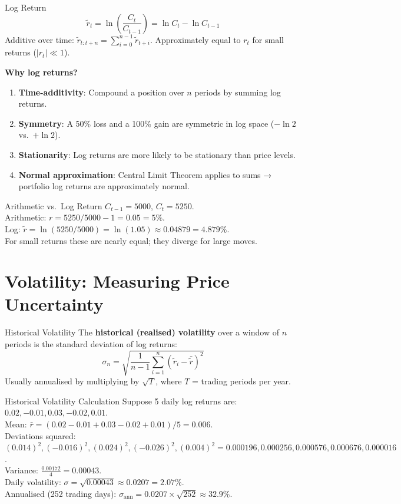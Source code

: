 \documentclass[12pt,a4paper,openany]{report}
\theoremstyle{definition}
\begin{document}
\begin{definitionbox}{Log Return}
\[
  \tilde{r}_t = \ln\!\left(\frac{C_t}{C_{t-1}}\right) = \ln C_t - \ln C_{t-1}
\]
Additive over time: $\tilde{r}_{t:t+n} = \sum_{i=0}^{n-1} \tilde{r}_{t+i}$. Approximately equal to $r_t$ for small returns ($|r_t| \ll 1$).
\end{definitionbox}

\textbf{Why log returns?}
\begin{enumerate}[label=\arabic*.]
  \item \textbf{Time-additivity}: Compound a position over $n$ periods by summing log returns.
  \item \textbf{Symmetry}: A 50\% loss and a 100\% gain are symmetric in log space ($-\ln 2$ vs.\ $+\ln 2$).
  \item \textbf{Stationarity}: Log returns are more likely to be stationary than price levels.
  \item \textbf{Normal approximation}: Central Limit Theorem applies to sums → portfolio log returns are approximately normal.
\end{enumerate}

\begin{examplebox}{Arithmetic vs.\ Log Return}
$C_{t-1} = 5000$, $C_t = 5250$. \\
Arithmetic: $r = 5250/5000 - 1 = 0.05 = 5\%$. \\
Log: $\tilde{r} = \ln(5250/5000) = \ln(1.05) \approx 0.04879 = 4.879\%$. \\
For small returns these are nearly equal; they diverge for large moves.
\end{examplebox}

\section{Volatility: Measuring Price Uncertainty}

\begin{definitionbox}{Historical Volatility}
The \textbf{historical (realised) volatility} over a window of $n$ periods is the standard deviation of log returns:
\[
  \sigma_n = \sqrt{\frac{1}{n-1} \sum_{i=1}^{n} (\tilde{r}_i - \bar{\tilde{r}})^2}
\]
Usually annualised by multiplying by $\sqrt{T}$, where $T$ = trading periods per year.
\end{definitionbox}

\begin{examplebox}{Historical Volatility Calculation}
Suppose 5 daily log returns are: $0.02, -0.01, 0.03, -0.02, 0.01$. \\
Mean: $\bar{r} = (0.02 - 0.01 + 0.03 - 0.02 + 0.01)/5 = 0.006$. \\
Deviations squared: $(0.014)^2, (-0.016)^2, (0.024)^2, (-0.026)^2, (0.004)^2 = 0.000196, 0.000256, 0.000576, 0.000676, 0.000016$. \\
Variance: $\frac{0.00172}{4} = 0.00043$. \\
Daily volatility: $\sigma = \sqrt{0.00043} \approx 0.0207 = 2.07\%$. \\
Annualised (252 trading days): $\sigma_{\text{ann}} = 0.0207 \times \sqrt{252} \approx 32.9\%$.
\end{examplebox}
\end{document}
